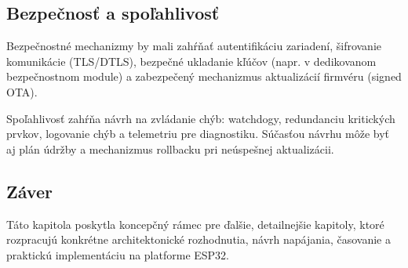 \subsection*{Bezpečnosť a spoľahlivosť}
Bezpečnostné mechanizmy by mali zahŕňať autentifikáciu zariadení, šifrovanie komunikácie (TLS/DTLS), bezpečné ukladanie kľúčov (napr. v dedikovanom bezpečnostnom module) a zabezpečený mechanizmus aktualizácií firmvéru (signed OTA).

Spoľahlivosť zahŕňa návrh na zvládanie chýb: watchdogy, redundanciu kritických prvkov, logovanie chýb a telemetriu pre diagnostiku. Súčasťou návrhu môže byť aj plán údržby a mechanizmus rollbacku pri neúspešnej aktualizácii.

\subsection*{Záver}
Táto kapitola poskytla koncepčný rámec pre ďalšie, detailnejšie kapitoly, ktoré rozpracujú konkrétne architektonické rozhodnutia, návrh napájania, časovanie a praktickú implementáciu na platforme ESP32.
